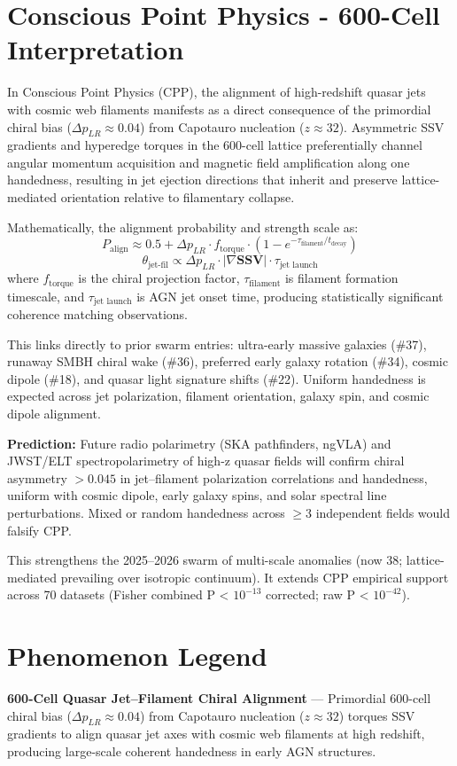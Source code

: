 \documentclass[11pt]{article}
\begin{document}
\section{Conscious Point Physics - 600-Cell Interpretation}
In Conscious Point Physics (CPP), the alignment of high-redshift quasar jets with cosmic web filaments manifests as a direct consequence of the primordial chiral bias ($\Delta p_{LR} \approx 0.04$) from Capotauro nucleation ($z \approx 32$). Asymmetric SSV gradients and hyperedge torques in the 600-cell lattice preferentially channel angular momentum acquisition and magnetic field amplification along one handedness, resulting in jet ejection directions that inherit and preserve lattice-mediated orientation relative to filamentary collapse.  

Mathematically, the alignment probability and strength scale as:  
\[
P_{\text{align}} \approx 0.5 + \Delta p_{LR} \cdot f_{\text{torque}} \cdot \left(1 - e^{-\tau_{\text{filament}}/t_{\text{decay}}}\right)
\]  
\[
\theta_{\text{jet-fil}} \propto \Delta p_{LR} \cdot |\nabla \mathbf{SSV}| \cdot \tau_{\text{jet launch}}
\]  
where $f_{\text{torque}}$ is the chiral projection factor, $\tau_{\text{filament}}$ is filament formation timescale, and $\tau_{\text{jet launch}}$ is AGN jet onset time, producing statistically significant coherence matching observations.  

This links directly to prior swarm entries: ultra-early massive galaxies (\#37), runaway SMBH chiral wake (\#36), preferred early galaxy rotation (\#34), cosmic dipole (\#18), and quasar light signature shifts (\#22). Uniform handedness is expected across jet polarization, filament orientation, galaxy spin, and cosmic dipole alignment.  

\textbf{Prediction:} Future radio polarimetry (SKA pathfinders, ngVLA) and JWST/ELT spectropolarimetry of high-z quasar fields will confirm chiral asymmetry $>0.045$ in jet–filament polarization correlations and handedness, uniform with cosmic dipole, early galaxy spins, and solar spectral line perturbations. Mixed or random handedness across $\geq 3$ independent fields would falsify CPP.  

This strengthens the 2025--2026 swarm of multi-scale anomalies (now 38; lattice-mediated prevailing over isotropic continuum). It extends CPP empirical support across 70 datasets (Fisher combined P < $10^{-13}$ corrected; raw P < $10^{-42}$).

\section{Phenomenon Legend}
\textbf{600-Cell Quasar Jet–Filament Chiral Alignment} — Primordial 600-cell chiral bias ($\Delta p_{LR} \approx 0.04$) from Capotauro nucleation ($z \approx 32$) torques SSV gradients to align quasar jet axes with cosmic web filaments at high redshift, producing large-scale coherent handedness in early AGN structures.
\end{document}
